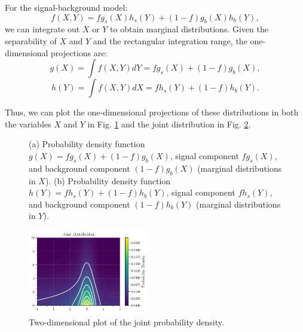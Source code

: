 \documentclass{article}
\begin{document}
For the signal-background model:
$$
f(X, Y) = f g_s(X)h_s(Y) + (1 - f)g_b(X)h_b(Y),
$$
we can integrate out $X$ or $Y$ to obtain marginal distributions. Given the separability of $X$ and $Y$ and the rectangular integration range, the one-dimensional projections are:
$$
g(X) = \int f(X,Y) dY = f g_s(X) + (1 - f) g_b(X),
$$
$$
h(Y) = \int f(X,Y) dX = f h_s(Y) + (1 - f) h_b(Y).
$$


Thus, we can plot the one-dimensional projections of these distributions in both the variables $X$ and $Y$ in Fig. \ref{fig:two_dists} and the joint distribution in Fig. \ref{fig:joint}.

\begin{figure}[!h]
    \centering
    \hspace{0.0\textwidth}
    \caption{(a) Probability density function $g(X) = f g_s(X) + (1-f) g_b(X)$, signal component $f g_s(X)$, and background component $(1-f) g_b(X)$ (marginal distributions in $X$). 
    (b) Probability density function $h(Y) = f h_s(Y) + (1-f) h_b(Y)$, signal component $f h_s(Y)$, and background component $(1-f) h_b(Y)$ (marginal distributions in $Y$).}
    \label{fig:two_dists}
\end{figure}


\begin{figure}[!htbp]
\centering
\includegraphics[width=0.47\textwidth]{./images/joint_distribution.pdf}
\caption{Two-dimensional plot of the joint probability density.}
\label{fig:joint}
\end{figure}
\end{document}

